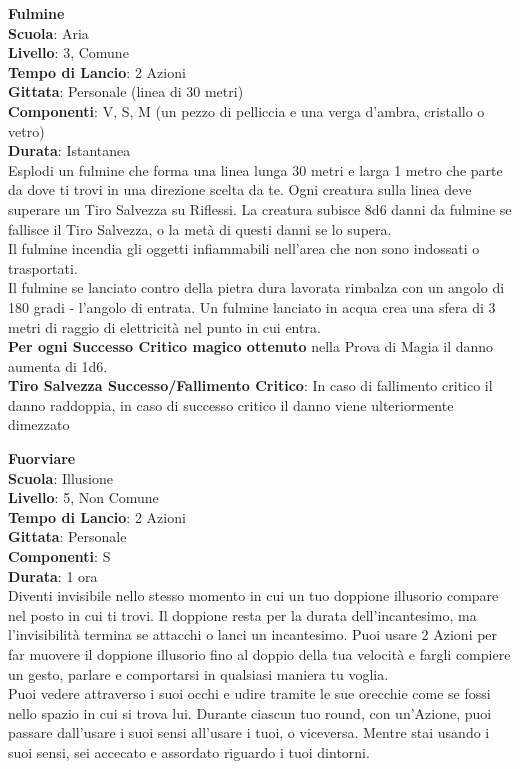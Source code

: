\begin{multicols}{2}
\medskip\textbf{Fulmine}\\
\textbf{Scuola}: Aria\\
\textbf{Livello}: 3, Comune\\
\textbf{Tempo di Lancio}: 2 Azioni\\
\textbf{Gittata}: Personale (linea di 30 metri)\\
\textbf{Componenti}: V, S, M (un pezzo di pelliccia e una verga d'ambra, cristallo o vetro)\\
\textbf{Durata}: Istantanea\\
Esplodi un fulmine che forma una linea lunga 30 metri e larga 1 metro che parte da dove ti trovi in una direzione scelta da te. Ogni creatura sulla linea deve superare un Tiro Salvezza su Riflessi. La creatura subisce 8d6 danni da fulmine se fallisce il Tiro Salvezza, o la metà di questi danni se lo supera.\\
Il fulmine incendia gli oggetti infiammabili nell'area che non sono indossati o trasportati.\\
Il fulmine se lanciato contro della pietra dura lavorata rimbalza con un angolo di 180 gradi - l'angolo di entrata. Un fulmine lanciato in acqua crea una sfera di 3 metri di raggio di elettricità nel punto in cui entra.\\
\textbf{Per ogni Successo Critico magico ottenuto} nella Prova di Magia il danno aumenta di 1d6.\\
\textbf{Tiro Salvezza Successo/Fallimento Critico}: In caso di fallimento critico il danno raddoppia, in caso di successo critico il danno viene ulteriormente dimezzato

\medskip\textbf{Fuorviare}\\
\textbf{Scuola}: Illusione\\
\textbf{Livello}: 5, Non Comune\\
\textbf{Tempo di Lancio}: 2 Azioni\\
\textbf{Gittata}: Personale\\
\textbf{Componenti}: S\\
\textbf{Durata}: 1 ora\\
Diventi invisibile nello stesso momento in cui un tuo doppione illusorio compare nel posto in cui ti trovi. Il doppione resta per la durata dell'incantesimo, ma l'invisibilità termina se attacchi o lanci un incantesimo. Puoi usare 2 Azioni per far muovere il doppione illusorio fino al doppio della tua velocità e fargli compiere un gesto, parlare e comportarsi in qualsiasi maniera tu voglia.\\
Puoi vedere attraverso i suoi occhi e udire tramite le sue orecchie come se fossi nello spazio in cui si trova lui. Durante ciascun tuo round, con un'Azione, puoi passare dall'usare i suoi sensi all'usare i tuoi, o viceversa. Mentre stai usando i suoi sensi, sei accecato e assordato riguardo i tuoi dintorni.


\end{multicols}
